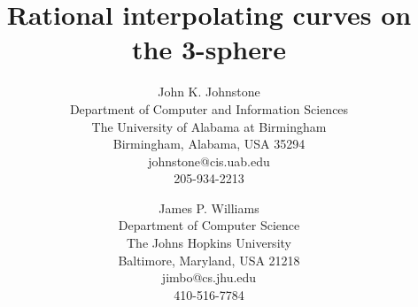 \newtheorem{rmk}{Remark}[section]
\newtheorem{example}{Example}[section]
\newtheorem{conjecture}{Conjecture}[section]
\newtheorem{claim}{Claim}[section]
\newtheorem{notation}{Notation}[section]
\newtheorem{lemma}{Lemma}[section]
\newtheorem{theorem}{Theorem}[section]
\newtheorem{corollary}{Corollary}[section]
\newtheorem{defn2}{Definition}


\DoubleSpace

\setlength{\oddsidemargin}{0pt}
\setlength{\topmargin}{-.25in}	%
\setlength{\headsep}{0pt}
\setlength{\textheight}{8.75in}
\setlength{\textwidth}{6.5in}
\setlength{\columnsep}{5mm}		%

\title{Rational interpolating curves on the 3-sphere}
\author{John K. Johnstone\\
	Department of Computer and Information Sciences\\
	The University of Alabama at Birmingham\\
	Birmingham, Alabama, USA 35294\\
	johnstone@cis.uab.edu\\
	205-934-2213
	\and 
	James P. Williams\\
	Department of Computer Science\\
	The Johns Hopkins University\\
	Baltimore, Maryland, USA 21218\\
	jimbo@cs.jhu.edu\\
	410-516-7784}



\maketitle

